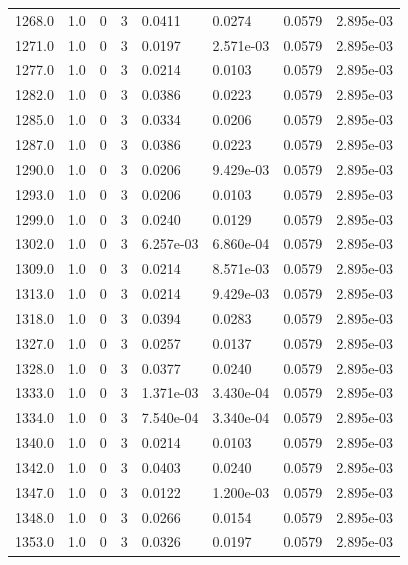 \documentclass[preview]{standalone}
\begin{document}
{{{{{{{{{\begin{tabular}{L{1.2cm}C{1.2cm} C{0.3cm}C{0.5cm} C{1.4cm}C{1.4cm} C{1.4cm}C{1.4cm}}
  1268.0  &   1.0  & 0     &  3 &  0.0411  & 0.0274  & 0.0579 &  2.895e-03   \\ 
  1271.0  &   1.0  & 0     &  3 &  0.0197  & 2.571e-03  & 0.0579 &  2.895e-03   \\ 
  1277.0  &   1.0  & 0     &  3 &  0.0214  & 0.0103  & 0.0579 &  2.895e-03   \\ 
  1282.0  &   1.0  & 0     &  3 &  0.0386  & 0.0223  & 0.0579 &  2.895e-03   \\ 
  1285.0  &   1.0  & 0     &  3 &  0.0334  & 0.0206  & 0.0579 &  2.895e-03   \\ 
  1287.0  &   1.0  & 0     &  3 &  0.0386  & 0.0223  & 0.0579 &  2.895e-03   \\ 
  1290.0  &   1.0  & 0     &  3 &  0.0206  & 9.429e-03  & 0.0579 &  2.895e-03   \\ 
  1293.0  &   1.0  & 0     &  3 &  0.0206  & 0.0103  & 0.0579 &  2.895e-03   \\ 
  1299.0  &   1.0  & 0     &  3 &  0.0240  & 0.0129  & 0.0579 &  2.895e-03   \\ 
  1302.0  &   1.0  & 0     &  3 &  6.257e-03  & 6.860e-04  & 0.0579 &  2.895e-03   \\ 
  1309.0  &   1.0  & 0     &  3 &  0.0214  & 8.571e-03  & 0.0579 &  2.895e-03   \\ 
  1313.0  &   1.0  & 0     &  3 &  0.0214  & 9.429e-03  & 0.0579 &  2.895e-03   \\ 
  1318.0  &   1.0  & 0     &  3 &  0.0394  & 0.0283  & 0.0579 &  2.895e-03   \\ 
  1327.0  &   1.0  & 0     &  3 &  0.0257  & 0.0137  & 0.0579 &  2.895e-03   \\ 
  1328.0  &   1.0  & 0     &  3 &  0.0377  & 0.0240  & 0.0579 &  2.895e-03   \\ 
  1333.0  &   1.0  & 0     &  3 &  1.371e-03  & 3.430e-04  & 0.0579 &  2.895e-03   \\ 
  1334.0  &   1.0  & 0     &  3 &  7.540e-04  & 3.340e-04  & 0.0579 &  2.895e-03   \\ 
  1340.0  &   1.0  & 0     &  3 &  0.0214  & 0.0103  & 0.0579 &  2.895e-03   \\ 
  1342.0  &   1.0  & 0     &  3 &  0.0403  & 0.0240  & 0.0579 &  2.895e-03   \\ 
  1347.0  &   1.0  & 0     &  3 &  0.0122  & 1.200e-03  & 0.0579 &  2.895e-03   \\ 
  1348.0  &   1.0  & 0     &  3 &  0.0266  & 0.0154  & 0.0579 &  2.895e-03   \\ 
  1353.0  &   1.0  & 0     &  3 &  0.0326  & 0.0197  & 0.0579 &  2.895e-03   \\ 

\end{tabular}}}}}}}}}}
\end{document}

